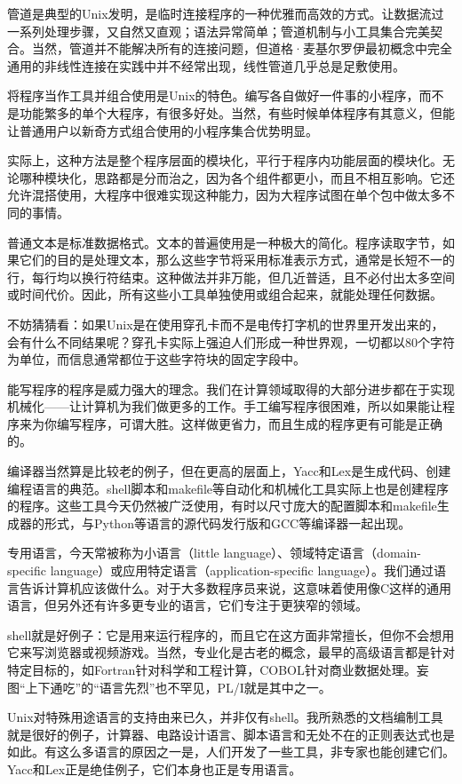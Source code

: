 \documentclass[a4paper,12pt,UTF8,twoside]{ctexbook}
\begin{document}
管道是典型的Unix发明，是临时连接程序的一种优雅而高效的方式。让数据流过一系列处理步骤，又自然又直观；语法异常简单；管道机制与小工具集合完美契合。当然，管道并不能解决所有的连接问题，但道格·麦基尔罗伊最初概念中完全通用的非线性连接在实践中并不经常出现，线性管道几乎总是足敷使用。

将程序当作工具并组合使用是Unix的特色。编写各自做好一件事的小程序，而不是功能繁多的单个大程序，有很多好处。当然，有些时候单体程序有其意义，但能让普通用户以新奇方式组合使用的小程序集合优势明显。

实际上，这种方法是整个程序层面的模块化，平行于程序内功能层面的模块化。无论哪种模块化，思路都是分而治之，因为各个组件都更小，而且不相互影响。它还允许混搭使用，大程序中很难实现这种能力，因为大程序试图在单个包中做太多不同的事情。

普通文本是标准数据格式。文本的普遍使用是一种极大的简化。程序读取字节，如果它们的目的是处理文本，那么这些字节将采用标准表示方式，通常是长短不一的行，每行均以换行符结束。这种做法并非万能，但几近普适，且不必付出太多空间或时间代价。因此，所有这些小工具单独使用或组合起来，就能处理任何数据。

不妨猜猜看：如果Unix是在使用穿孔卡而不是电传打字机的世界里开发出来的，会有什么不同结果呢？穿孔卡实际上强迫人们形成一种世界观，一切都以80个字符为单位，而信息通常都位于这些字符块的固定字段中。

能写程序的程序是威力强大的理念。我们在计算领域取得的大部分进步都在于实现机械化——让计算机为我们做更多的工作。手工编写程序很困难，所以如果能让程序来为你编写程序，可谓大胜。这样做更省力，而且生成的程序更有可能是正确的。

编译器当然算是比较老的例子，但在更高的层面上，Yacc和Lex是生成代码、创建编程语言的典范。shell脚本和makefile等自动化和机械化工具实际上也是创建程序的程序。这些工具今天仍然被广泛使用，有时以尺寸庞大的配置脚本和makefile生成器的形式，与Python等语言的源代码发行版和GCC等编译器一起出现。

专用语言，今天常被称为小语言（little language）、领域特定语言（domain-specific language）或应用特定语言（application-specific language）。我们通过语言告诉计算机应该做什么。对于大多数程序员来说，这意味着使用像C这样的通用语言，但另外还有许多更专业的语言，它们专注于更狭窄的领域。

shell就是好例子：它是用来运行程序的，而且它在这方面非常擅长，但你不会想用它来写浏览器或视频游戏。当然，专业化是古老的概念，最早的高级语言都是针对特定目标的，如Fortran针对科学和工程计算，COBOL针对商业数据处理。妄图“上下通吃”的“语言先烈”也不罕见，PL/I就是其中之一。

Unix对特殊用途语言的支持由来已久，并非仅有shell。我所熟悉的文档编制工具就是很好的例子，计算器、电路设计语言、脚本语言和无处不在的正则表达式也是如此。有这么多语言的原因之一是，人们开发了一些工具，非专家也能创建它们。Yacc和Lex正是绝佳例子，它们本身也正是专用语言。
\end{document}
